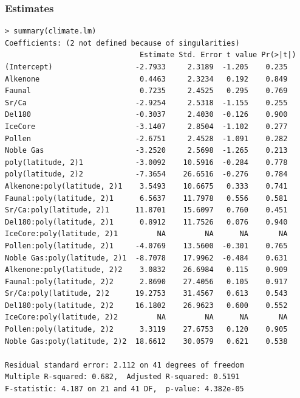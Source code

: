\documentclass[handout]{beamer}
\begin{document}
\begin{frame}[fragile]
  \frametitle{Estimates}
  \begin{tiny}
\begin{verbatim}
> summary(climate.lm)
Coefficients: (2 not defined because of singularities)
                               Estimate Std. Error t value Pr(>|t|)
(Intercept)                   -2.7933     2.3189  -1.205    0.235
Alkenone                       0.4463     2.3234   0.192    0.849
Faunal                         0.7235     2.4525   0.295    0.769
Sr/Ca                         -2.9254     2.5318  -1.155    0.255
Del180                        -0.3037     2.4030  -0.126    0.900
IceCore                       -3.1407     2.8504  -1.102    0.277
Pollen                        -2.6751     2.4528  -1.091    0.282
Noble Gas                     -3.2520     2.5698  -1.265    0.213
poly(latitude, 2)1            -3.0092    10.5916  -0.284    0.778
poly(latitude, 2)2            -7.3654    26.6516  -0.276    0.784
Alkenone:poly(latitude, 2)1    3.5493    10.6675   0.333    0.741
Faunal:poly(latitude, 2)1      6.5637    11.7978   0.556    0.581
Sr/Ca:poly(latitude, 2)1      11.8701    15.6097   0.760    0.451
Del180:poly(latitude, 2)1      0.8912    11.7526   0.076    0.940
IceCore:poly(latitude, 2)1         NA         NA      NA       NA
Pollen:poly(latitude, 2)1     -4.0769    13.5600  -0.301    0.765
Noble Gas:poly(latitude, 2)1  -8.7078    17.9962  -0.484    0.631
Alkenone:poly(latitude, 2)2    3.0832    26.6984   0.115    0.909
Faunal:poly(latitude, 2)2      2.8690    27.4056   0.105    0.917
Sr/Ca:poly(latitude, 2)2      19.2753    31.4567   0.613    0.543
Del180:poly(latitude, 2)2     16.1802    26.9623   0.600    0.552
IceCore:poly(latitude, 2)2         NA         NA      NA       NA
Pollen:poly(latitude, 2)2      3.3119    27.6753   0.120    0.905
Noble Gas:poly(latitude, 2)2  18.6612    30.0579   0.621    0.538

Residual standard error: 2.112 on 41 degrees of freedom
Multiple R-squared: 0.682,	Adjusted R-squared: 0.5191
F-statistic: 4.187 on 21 and 41 DF,  p-value: 4.382e-05

\end{verbatim}
  \end{tiny}
\end{frame}
\end{document}
